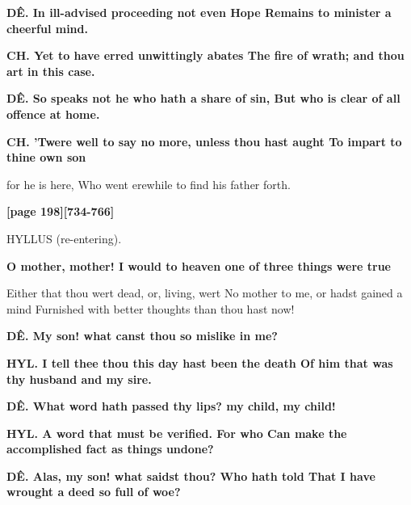 \documentclass[11pt,letter]{book}
\begin{document}
\par \textbf{DÊ. In ill-advised proceeding not even Hope Remains to minister a cheerful mind.}
\par 

\par \textbf{CH. Yet to have erred unwittingly abates The fire of wrath; and thou art in this case.}
\par 

\par \textbf{DÊ. So speaks not he who hath a share of sin, But who is clear of all offence at home.}
\par 

\par \textbf{CH. ’Twere well to say no more, unless thou hast aught To impart to thine own son}
\par   for he is here, Who went erewhile to find his father forth.

\par \textbf{[page 198][734-766]}
\par 

\par  HYLLUS (re-entering).

\par \textbf{O mother, mother! I would to heaven one of three things were true}
\par   Either that thou wert dead, or, living, wert No mother to me, or hadst gained a mind Furnished with better thoughts than thou hast now!

\par \textbf{DÊ. My son! what canst thou so mislike in me?}
\par 

\par \textbf{HYL. I tell thee thou this day hast been the death Of him that was thy husband and my sire.}
\par 

\par \textbf{DÊ. What word hath passed thy lips? my child, my child!}
\par 

\par \textbf{HYL. A word that must be verified. For who Can make the accomplished fact as things undone?}
\par 

\par \textbf{DÊ. Alas, my son! what saidst thou? Who hath told That I have wrought a deed so full of woe?}
\par 
\end{document}
